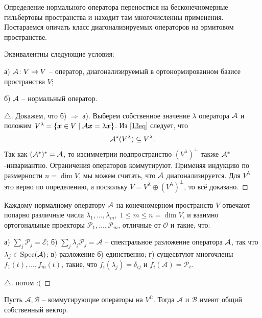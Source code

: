 Определение нормального оператора переностися на бесконечномерные гильбертовы пространства и находит там многочисленны применения. Постараемся опичать класс диагонализируемых операторов на эрмитовом пространстве.

\begin{to_thr} 
    Эквивалентны следующие условия: 

    а) $\mathcal A \colon V \to V$ -- оператор, диагонализируемый в ортонормированном базисе пространства $V$;

    б) $\mathcal A$ -- нормальный оператор.
\end{to_thr}

\begin{proof}[$\triangle$]
    Докажем, что б) $\Longrightarrow$ а). Выберем собственное значение $\lambda$ оператора $\mathcal A$ и положим $V^{\lambda} = \{ \mbox{\boldmath $x$} \in V \mid \mathcal A \mbox{\boldmath $x$} = \lambda \mbox{\boldmath $x$}\}$. Из \eqref{13eq} следует, что 
    $$
        \mathcal A^* (V^{\lambda}) \subseteq V^{\lambda}.
    $$
    Так как $(\mathcal A^*)^* = \mathcal A$, то изсимметрии подпространство $(V^\lambda)^{\bot}$ также $\mathcal A^*$-инвариантно. Ограничения операторов коммутируют. Применяя индукцию по размерности $n = \dim V$, мы можем считать, что $\mathcal A$  диагонализируется. Для $V^{\lambda}$ это верно по определению, а поскольку $V = V^\lambda \oplus \left(V^\lambda\right)^{\bot}$, то всё доказано.  
\end{proof}


\begin{to_thr} 
    Каждому нормалному оператору $\mathcal A$ на конечномерном пространств $V$ отвечают попарно различные числа $\lambda_{1}, \ldots, \lambda_m, \; 1 \leq m \leq n = \dim V$, и взаимно ортогональные проекторы $\mathcal P_{1}, \ldots, \mathcal P_m$, отличные от $\mathcal O$ и такие, что:

    а) $\sum_j \mathcal P_j = \mathcal E$;
    б) $\sum_j \lambda_j \mathcal P_j = \mathcal A$ -- спектральное разложение оператора $\mathcal A$,  так что $\lambda_j \in \text{Spec} (\mathcal A)$;
    в) разложение б) единственно;
    г) сущесвтуют многочлены $f_{1}(t), \ldots, f_m(t)$, такие, что
    $f_i (\lambda_j) = \delta_{ij}$ и $f_i(\mathcal A) = \mathcal P_i$.
\end{to_thr}

\begin{proof}[$\triangle$]
    потом :(
\end{proof}

\begin{to_lem} 
    Пусть $\mathcal A, \mathcal B$ -- коммутирующие операторы на $V^{\mathbb{ C}}$. Тогда $\mathcal A$ и $\mathcal B$ имеют общий собственный вектор. 
\end{to_lem}


